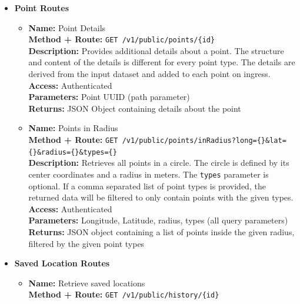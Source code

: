 \begin{itemize}
  \item{
    \textbf{Point Routes}
    \begin{itemize}
      \item { \textbf{Name:} Point Details\\
          \textbf{Method + Route:} \texttt{GET /v1/public/points/\{id\}}\\
          \textbf{Description:} Provides additional details about a point. The
          structure and content of the details is different for every point
          type. The details are derived from the input dataset and added to each
          point on ingress.\\
          \textbf{Access:} Authenticated\\
          \textbf{Parameters:} Point UUID (path parameter)\\
          \textbf{Returns:} JSON Object containing details about the point\\
        }
      \item { \textbf{Name:} Points in Radius\\
          \textbf{Method + Route:} \texttt{GET
          /v1/public/points/inRadius?long=\{\}\&lat=\{\}\&radius=\{\}\&types=\{\}}\\
          \textbf{Description:} Retrieves all points in a circle. The circle is
          defined by its center coordinates and a radius in meters. The
          \texttt{types} parameter is optional. If a comma separated list of
          point types is provided, the returned data will be filtered to only
          contain points with the given types.\\
          \textbf{Access:} Authenticated\\
          \textbf{Parameters:} Longitude, Latitude, radius, types (all query
          parameters)\\
          \textbf{Returns:} JSON object containing a list of points inside the
          given radius, filtered by the given point types\\
        }
    \end{itemize}
  }
  \item{
    \textbf{Saved Location Routes}
    \begin{itemize}
      \item {
        \textbf{Name:} Retrieve saved locations\\
        \textbf{Method + Route:} \texttt{GET /v1/public/history/\{id\}}\\
}
\end{itemize}}
\end{itemize}
